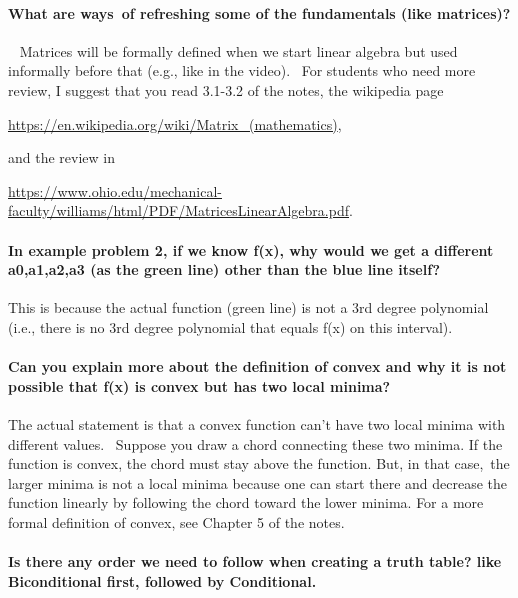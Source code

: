 \documentclass[10pt,english]{article}
\begin{document}
\paragraph{What are ways of refreshing some of the fundamentals (like matrices)?}
 
Matrices will be formally defined when we start linear algebra but used informally before that (e.g., like in the video).  For students who need more review, I suggest that you read 3.1-3.2 of the notes, the wikipedia page
\begin{center}
\url{https://en.wikipedia.org/wiki/Matrix_(mathematics)},
\end{center}
and the review in
\begin{center}
 \url{https://www.ohio.edu/mechanical-faculty/williams/html/PDF/MatricesLinearAlgebra.pdf}.
\end{center}


\paragraph{In example problem 2, if we know f(x), why would we get a different a0,a1,a2,a3 (as the green line) other than the blue line itself?}

This is because the actual function (green line) is not a 3rd degree polynomial (i.e., there is no 3rd degree polynomial that equals f(x) on this interval).


\paragraph{Can you explain more about the definition of convex and why it is not possible that f(x) is convex but has two local minima?}

The actual statement is that a convex function can't have two local minima with different values.  Suppose you draw a chord connecting these two minima.  If the function is convex, the chord must stay above the function.
But, in that case, the larger minima is not a local minima because one can start there and decrease the function linearly by following the chord toward the lower minima.  For a more formal definition of convex, see Chapter 5 of the notes.


\paragraph{Is there any order we need to follow when creating a truth table? like Biconditional first, followed by Conditional.}
\end{document}

